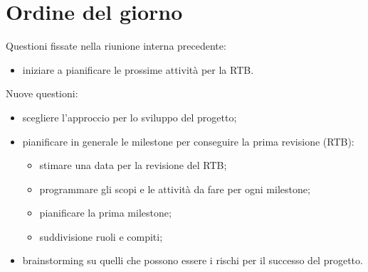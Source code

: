 \documentclass[12pt]{article}
\begin{document}
    \section{Ordine del giorno}
        Questioni fissate nella riunione interna precedente:
    	\begin{itemize}
    		\item iniziare a pianificare le prossime attività per la RTB.
    	\end{itemize}
    	Nuove questioni:
    	\begin{itemize}
    		\item scegliere l'approccio per lo sviluppo del progetto;
    		\item pianificare in generale le milestone per conseguire la prima revisione (RTB):
    		\begin{itemize}
				\item stimare una data per la revisione del RTB;
				\item programmare gli scopi e le attività da fare per ogni milestone;
				\item pianificare la prima milestone;
				\item suddivisione ruoli e compiti;
			\end{itemize}
			\item brainstorming su quelli che possono essere i rischi per il successo del progetto.
    	\end{itemize}
    
\end{document}
